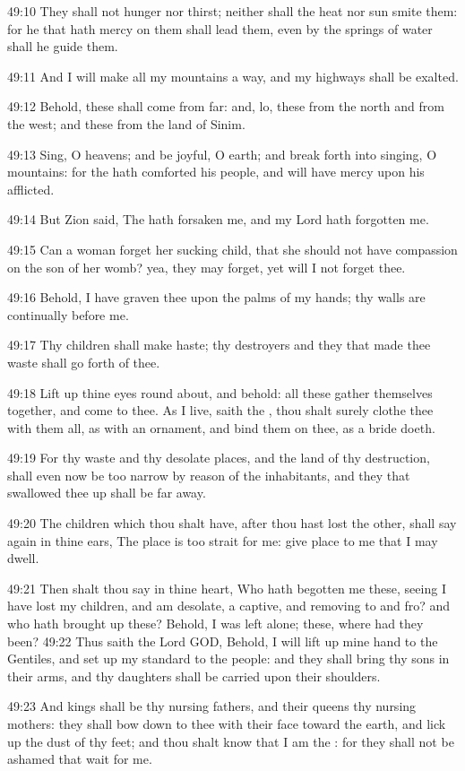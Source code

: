 49:10 They shall not hunger nor thirst; neither shall the heat nor sun smite them: for he that hath mercy on them shall lead them, even by the springs of water shall he guide them.

49:11 And I will make all my mountains a way, and my highways shall be exalted.

49:12 Behold, these shall come from far: and, lo, these from the north and from the west; and these from the land of Sinim.

49:13 Sing, O heavens; and be joyful, O earth; and break forth into singing, O mountains: for the \LORD hath comforted his people, and will have mercy upon his afflicted.

49:14 But Zion said, The \LORD hath forsaken me, and my Lord hath forgotten me.

49:15 Can a woman forget her sucking child, that she should not have compassion on the son of her womb? yea, they may forget, yet will I not forget thee.

49:16 Behold, I have graven thee upon the palms of my hands; thy walls are continually before me.

49:17 Thy children shall make haste; thy destroyers and they that made thee waste shall go forth of thee.

49:18 Lift up thine eyes round about, and behold: all these gather themselves together, and come to thee. As I live, saith the \LORD, thou shalt surely clothe thee with them all, as with an ornament, and bind them on thee, as a bride doeth.

49:19 For thy waste and thy desolate places, and the land of thy destruction, shall even now be too narrow by reason of the inhabitants, and they that swallowed thee up shall be far away.

49:20 The children which thou shalt have, after thou hast lost the other, shall say again in thine ears, The place is too strait for me: give place to me that I may dwell.

49:21 Then shalt thou say in thine heart, Who hath begotten me these, seeing I have lost my children, and am desolate, a captive, and removing to and fro? and who hath brought up these? Behold, I was left alone; these, where had they been?  49:22 Thus saith the Lord GOD, Behold, I will lift up mine hand to the Gentiles, and set up my standard to the people: and they shall bring thy sons in their arms, and thy daughters shall be carried upon their shoulders.

49:23 And kings shall be thy nursing fathers, and their queens thy nursing mothers: they shall bow down to thee with their face toward the earth, and lick up the dust of thy feet; and thou shalt know that I am the \LORD: for they shall not be ashamed that wait for me.

